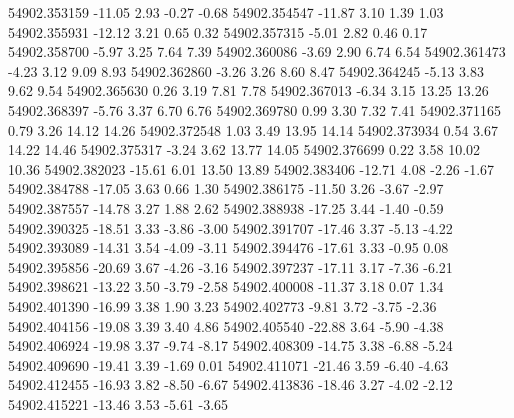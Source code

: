 54902.353159      -11.05        2.93       -0.27       -0.68
54902.354547      -11.87        3.10        1.39        1.03
54902.355931      -12.12        3.21        0.65        0.32
54902.357315       -5.01        2.82        0.46        0.17
54902.358700       -5.97        3.25        7.64        7.39
54902.360086       -3.69        2.90        6.74        6.54
54902.361473       -4.23        3.12        9.09        8.93
54902.362860       -3.26        3.26        8.60        8.47
54902.364245       -5.13        3.83        9.62        9.54
54902.365630        0.26        3.19        7.81        7.78
54902.367013       -6.34        3.15       13.25       13.26
54902.368397       -5.76        3.37        6.70        6.76
54902.369780        0.99        3.30        7.32        7.41
54902.371165        0.79        3.26       14.12       14.26
54902.372548        1.03        3.49       13.95       14.14
54902.373934        0.54        3.67       14.22       14.46
54902.375317       -3.24        3.62       13.77       14.05
54902.376699        0.22        3.58       10.02       10.36
54902.382023      -15.61        6.01       13.50       13.89
54902.383406      -12.71        4.08       -2.26       -1.67
54902.384788      -17.05        3.63        0.66        1.30
54902.386175      -11.50        3.26       -3.67       -2.97
54902.387557      -14.78        3.27        1.88        2.62
54902.388938      -17.25        3.44       -1.40       -0.59
54902.390325      -18.51        3.33       -3.86       -3.00
54902.391707      -17.46        3.37       -5.13       -4.22
54902.393089      -14.31        3.54       -4.09       -3.11
54902.394476      -17.61        3.33       -0.95        0.08
54902.395856      -20.69        3.67       -4.26       -3.16
54902.397237      -17.11        3.17       -7.36       -6.21
54902.398621      -13.22        3.50       -3.79       -2.58
54902.400008      -11.37        3.18        0.07        1.34
54902.401390      -16.99        3.38        1.90        3.23
54902.402773       -9.81        3.72       -3.75       -2.36
54902.404156      -19.08        3.39        3.40        4.86
54902.405540      -22.88        3.64       -5.90       -4.38
54902.406924      -19.98        3.37       -9.74       -8.17
54902.408309      -14.75        3.38       -6.88       -5.24
54902.409690      -19.41        3.39       -1.69        0.01
54902.411071      -21.46        3.59       -6.40       -4.63
54902.412455      -16.93        3.82       -8.50       -6.67
54902.413836      -18.46        3.27       -4.02       -2.12
54902.415221      -13.46        3.53       -5.61       -3.65

